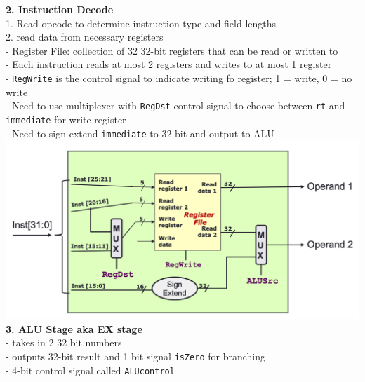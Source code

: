 \documentclass[10pt, a4paper]{article}
\begin{document}
\begin{multicols*}{3}
		\textbf{2. Instruction Decode}\\
		1. Read opcode to determine instruction type and field lengths\\
		2. read data from necessary registers\\
		- Register File: collection of 32 32-bit registers that can be read or written to\\
		- Each instruction reads at most 2 registers and writes to at most 1 register\\
		- \texttt{RegWrite} is the control signal to indicate writing fo register; 1 = write, 0 = no write\\
		- Need to use multiplexer with \texttt{RegDst} control signal to choose between \texttt{rt} and \texttt{immediate} for write register\\
		- Need to sign extend \texttt{immediate} to 32 bit and output to ALU\\
		\includegraphics[scale=.2]{./assets/decodeStage}\\
		
		\textbf{3. ALU Stage aka EX stage}\\
		- takes in 2 32 bit numbers\\
		- outputs 32-bit result and 1 bit signal \texttt{isZero} for branching\\
		- 4-bit control signal called \texttt{ALUcontrol}\\
		

\end{multicols*}
\end{document}
